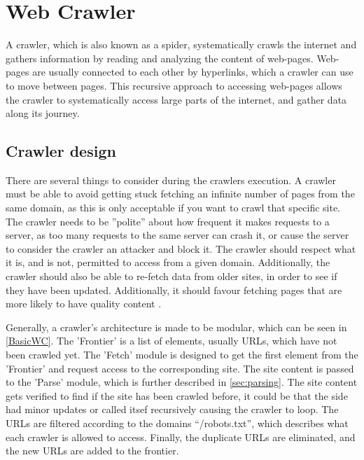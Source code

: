 \section{Web Crawler}\label{subsec:crawler}
A crawler, which is also known as a spider, systematically crawls the internet
and gathers information by reading and analyzing the content of web-pages.
Web-pages are usually connected to each other by hyperlinks, which a
crawler can use to move between pages. This recursive approach to accessing
web-pages allows the crawler to systematically access large parts of the
internet, and gather data along its journey. \Source %

\subsection{Crawler design}%
There are several things to consider during the crawlers execution. A crawler
must be able to avoid getting stuck fetching an infinite number of pages from
the same domain, as this is only acceptable if you want to crawl that specific
site.
The crawler needs to be ''polite'' about how frequent it makes requests to a
server, as too many requests to the same server can crash it, or cause the
server to consider the crawler an attacker and block it.
The crawler should respect what it is, and is not, permitted to access from a
given domain. Additionally, the crawler should also be able to re-fetch data
from older sites, in order to see if they have been updated. Additionally, it
should favour fetching pages that are more likely to have quality content \citep[Ch.
20.1]{manning2008introduction}.\nl

Generally, a crawler's architecture is made to be modular, which can be seen in
\autoref{BasicWC}. The 'Frontier' is a list of elements, usually URLs, which
have not been crawled yet. The 'Fetch' module is designed to get the first
element from the 'Frontier' and request access to the corresponding site. The
site content is passed to the 'Parse' module, which is further described in
\autoref{sec:parsing}. The site content gets verified to find if the site has
been crawled before, it could be that the side had minor updates or called
itsef recursively causing the crawler to loop.
The URLs are filtered according to the domains ``/robots.txt'', which describes
what each crawler is allowed to access. Finally, the duplicate URLs are
eliminated, and the new URLs are added to the frontier.\nl%



